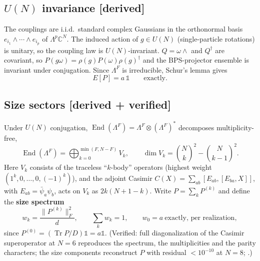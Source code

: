 \documentclass[11pt]{article}
\newcommand{\Tr}{\operatorname{Tr}}
\newcommand{\one}{\mathds 1}
\newcommand{\End}{\operatorname{End}}
\newcommand{\tagbox}[2]{\textsf{\small\color{#1}[#2]}}
\newcommand{\DER}{\tagbox{cder}{derived}}
\newcommand{\VER}{\tagbox{cder}{derived + verified}}
\theoremstyle{remark}
\begin{document}
\subsection{$U(N)$ invariance \DER}
The couplings are i.i.d.\ standard complex Gaussians in the orthonormal basis $e_{i_1}\wedge\cdots\wedge e_{i_p}$ of
$\Lambda^p\mathbb C^N$. The induced action of $g\in U(N)$ (single-particle rotations) is unitary, so the coupling law is
$U(N)$-invariant. $Q=\omega\wedge$ and $Q^\dagger$ are covariant, so $P(g\omega)=\rho(g)P(\omega)\rho(g)^\dagger$ and the
BPS-projector ensemble is invariant under conjugation. Since $\Lambda^F$ is irreducible, Schur's lemma gives
\begin{equation}
E[P]=a\,\one\qquad\text{exactly.}
\end{equation}

\subsection{Size sectors \VER}
Under $U(N)$ conjugation, $\End(\Lambda^F)=\Lambda^F\otimes(\Lambda^F)^*$ decomposes multiplicity-free,
\begin{equation}
\End(\Lambda^F)=\bigoplus_{k=0}^{\min(F,N-F)}V_k,\qquad \dim V_k=\binom Nk^2-\binom N{k-1}^2 .
\end{equation}
Here $V_k$ consists of the traceless ``$k$-body'' operators (highest weight $(1^k,0,\ldots,0,(-1)^k)$), and the adjoint
Casimir $C(X)=\sum_{ab}[E_{ab},[E_{ba},X]]$, with $E_{ab}=\bar\psi_a\psi_b$, acts on $V_k$ as $2k(N+1-k)$. Write
$P=\sum_kP^{(k)}$ and define the \textbf{size spectrum}
\begin{equation}
w_k=\frac{\|P^{(k)}\|_F^2}{d},\qquad \sum_kw_k=1,\qquad \boxed{w_0=a\ \text{exactly, per realization}},
\end{equation}
since $P^{(0)}=(\Tr P/D)\one=a\one$. (Verified: full diagonalization of the Casimir superoperator at $N=6$
reproduces the spectrum, the multiplicities and the parity characters; the size components reconstruct $P$ with
residual $<10^{-10}$ at $N=8$; .)
\end{document}
